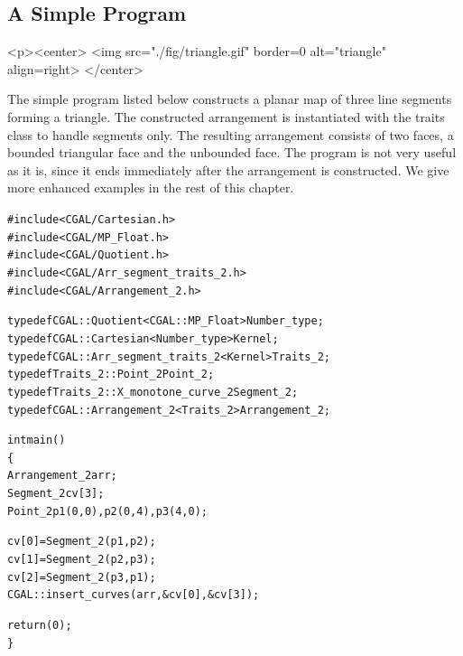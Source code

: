\subsection{A Simple Program}

\lcTex{%
  \setlength{\ArrangementTwoWidthRight}{1.6cm}
  \setlength{\ArrangementTwoWidthLeft}{\ArrangementTwoWidthLineReal}
  \addtolength{\ArrangementTwoWidthLeft}{-\ArrangementTwoWidthRight}
  \begin{minipage}{\ArrangementTwoWidthLeft}
}
\begin{ccHtmlOnly}
  <p><center>
    <img src="./fig/triangle.gif" border=0 alt="triangle" align=right>
  </center>
\end{ccHtmlOnly}
The simple program listed below constructs a planar map of three line
segments forming a triangle. The constructed arrangement is instantiated
with the  traits class to handle segments only.
The resulting arrangement consists of two faces, a bounded triangular face
and the unbounded face.
The program is not very useful as it is, since it ends immediately
after the arrangement is constructed. We give more enhanced examples
in the rest of this chapter.

\begin{alltt}
#include <CGAL/Cartesian.h>
#include <CGAL/MP_Float.h>
#include <CGAL/Quotient.h>
#include <CGAL/Arr_segment_traits_2.h>
#include <CGAL/Arrangement_2.h>

typedef CGAL::Quotient<CGAL::MP_Float>     Number_type;
typedef CGAL::Cartesian<Number_type>       Kernel;
typedef CGAL::Arr_segment_traits_2<Kernel> Traits_2;
typedef Traits_2::Point_2                  Point_2;
typedef Traits_2::X_monotone_curve_2       Segment_2;
typedef CGAL::Arrangement_2<Traits_2>      Arrangement_2;

int main()
\{
  Arrangement_2   arr;
  Segment_2       cv[3];
  Point_2         p1 (0, 0), p2 (0, 4), p3 (4, 0);
 
  cv[0] = Segment_2 (p1, p2);
  cv[1] = Segment_2 (p2, p3);
  cv[2] = Segment_2 (p3, p1);
  CGAL::insert_curves (arr, &cv[0], &cv[3]);

  return (0);
\}
\end{alltt}

